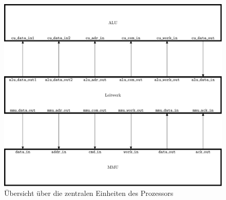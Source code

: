
\begin{figure}[H]
\includegraphics[width=\textwidth]{./appendix/img/units.pdf}
\caption[\"Ubersicht \"uber die zentralen Einheiten des Prozessors]{\"Ubersicht \"uber die zentralen Einheiten des Prozessors}
\label{fig:units}
\end{figure}
